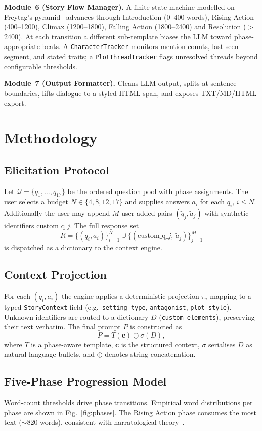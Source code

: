 \documentclass[conference,10pt,a4paper]{IEEEtran}
\begin{document}
\textbf{Module~6 (Story Flow Manager).} A finite-state machine
modelled on Freytag's pyramid~\cite{freytag1900drama} advances through
Introduction (0--400 words), Rising Action (400--1200), Climax
(1200--1800), Falling Action (1800--2400) and Resolution
($>$2400). At each transition a different sub-template biases the LLM
toward phase-appropriate beats. A \texttt{CharacterTracker} monitors
mention counts, last-seen segment, and stated traits; a
\texttt{PlotThreadTracker} flags unresolved threads beyond
configurable thresholds.

\textbf{Module~7 (Output Formatter).} Cleans LLM output, splits at
sentence boundaries, lifts dialogue to a styled HTML span, and exposes
TXT/MD/HTML export.

\section{Methodology}\label{sec:method}

\subsection{Elicitation Protocol}
Let $\mathcal{Q}=\{q_1,\ldots,q_{17}\}$ be the ordered question pool
with phase assignments. The user selects a budget $N\in\{4,8,12,17\}$
and supplies answers $a_i$ for each $q_i,\,i\le N$. Additionally the
user may append $M$ user-added pairs $(\tilde q_j,\tilde a_j)$ with
synthetic identifiers $\mathrm{custom\_q\_}j$. The full response set
\[
R = \{(q_i, a_i)\}_{i=1}^{N} \cup \{(\mathrm{custom\_q\_}j,\, \tilde a_j)\}_{j=1}^{M}
\]
is dispatched as a dictionary to the context engine.

\subsection{Context Projection}
For each $(q_i,a_i)$ the engine applies a deterministic projection
$\pi_i$ mapping to a typed \texttt{StoryContext} field
(e.g.\ \texttt{setting\_type}, \texttt{antagonist},
\texttt{plot\_style}). Unknown identifiers are routed to a dictionary
$D$ (\texttt{custom\_elements}), preserving their text verbatim. The
final prompt $P$ is constructed as
\[
P = T(\mathbf{c}) \oplus \sigma(D),
\]
where $T$ is a phase-aware template, $\mathbf{c}$ is the structured
context, $\sigma$ serialises $D$ as natural-language bullets, and
$\oplus$ denotes string concatenation.

\subsection{Five-Phase Progression Model}
Word-count thresholds drive phase transitions. Empirical word
distributions per phase are shown in Fig.~\ref{fig:phases}. The
Rising Action phase consumes the most text ($\sim$820 words),
consistent with narratological theory~\cite{freytag1900drama,bal2017narratology}.
\end{document}
